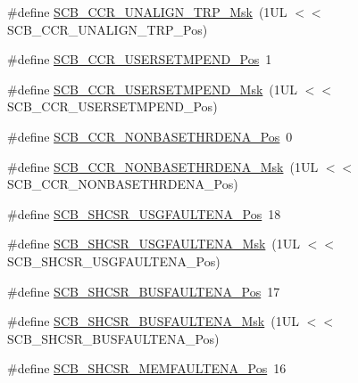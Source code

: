 \begin{DoxyCompactItemize}
\item 
\#define \hyperlink{group___c_m_s_i_s___s_c_b_ga68c96ad594af70c007923979085c99e0}{S\-C\-B\-\_\-\-C\-C\-R\-\_\-\-U\-N\-A\-L\-I\-G\-N\-\_\-\-T\-R\-P\-\_\-\-Msk}~(1\-U\-L $<$$<$ S\-C\-B\-\_\-\-C\-C\-R\-\_\-\-U\-N\-A\-L\-I\-G\-N\-\_\-\-T\-R\-P\-\_\-\-Pos)
\item 
\#define \hyperlink{group___c_m_s_i_s___s_c_b_ga789e41f45f59a8cd455fd59fa7652e5e}{S\-C\-B\-\_\-\-C\-C\-R\-\_\-\-U\-S\-E\-R\-S\-E\-T\-M\-P\-E\-N\-D\-\_\-\-Pos}~1
\item 
\#define \hyperlink{group___c_m_s_i_s___s_c_b_ga4cf59b6343ca962c80e1885710da90aa}{S\-C\-B\-\_\-\-C\-C\-R\-\_\-\-U\-S\-E\-R\-S\-E\-T\-M\-P\-E\-N\-D\-\_\-\-Msk}~(1\-U\-L $<$$<$ S\-C\-B\-\_\-\-C\-C\-R\-\_\-\-U\-S\-E\-R\-S\-E\-T\-M\-P\-E\-N\-D\-\_\-\-Pos)
\item 
\#define \hyperlink{group___c_m_s_i_s___s_c_b_gab4615f7deb07386350365b10240a3c83}{S\-C\-B\-\_\-\-C\-C\-R\-\_\-\-N\-O\-N\-B\-A\-S\-E\-T\-H\-R\-D\-E\-N\-A\-\_\-\-Pos}~0
\item 
\#define \hyperlink{group___c_m_s_i_s___s_c_b_gafe0f6be81b35d72d0736a0a1e3b4fbb3}{S\-C\-B\-\_\-\-C\-C\-R\-\_\-\-N\-O\-N\-B\-A\-S\-E\-T\-H\-R\-D\-E\-N\-A\-\_\-\-Msk}~(1\-U\-L $<$$<$ S\-C\-B\-\_\-\-C\-C\-R\-\_\-\-N\-O\-N\-B\-A\-S\-E\-T\-H\-R\-D\-E\-N\-A\-\_\-\-Pos)
\item 
\#define \hyperlink{group___c_m_s_i_s___s_c_b_gae71949507636fda388ec11d5c2d30b52}{S\-C\-B\-\_\-\-S\-H\-C\-S\-R\-\_\-\-U\-S\-G\-F\-A\-U\-L\-T\-E\-N\-A\-\_\-\-Pos}~18
\item 
\#define \hyperlink{group___c_m_s_i_s___s_c_b_ga056fb6be590857bbc029bed48b21dd79}{S\-C\-B\-\_\-\-S\-H\-C\-S\-R\-\_\-\-U\-S\-G\-F\-A\-U\-L\-T\-E\-N\-A\-\_\-\-Msk}~(1\-U\-L $<$$<$ S\-C\-B\-\_\-\-S\-H\-C\-S\-R\-\_\-\-U\-S\-G\-F\-A\-U\-L\-T\-E\-N\-A\-\_\-\-Pos)
\item 
\#define \hyperlink{group___c_m_s_i_s___s_c_b_ga3d32edbe4a5c0335f808cfc19ec7e844}{S\-C\-B\-\_\-\-S\-H\-C\-S\-R\-\_\-\-B\-U\-S\-F\-A\-U\-L\-T\-E\-N\-A\-\_\-\-Pos}~17
\item 
\#define \hyperlink{group___c_m_s_i_s___s_c_b_ga43e8cbe619c9980e0d1aacc85d9b9e47}{S\-C\-B\-\_\-\-S\-H\-C\-S\-R\-\_\-\-B\-U\-S\-F\-A\-U\-L\-T\-E\-N\-A\-\_\-\-Msk}~(1\-U\-L $<$$<$ S\-C\-B\-\_\-\-S\-H\-C\-S\-R\-\_\-\-B\-U\-S\-F\-A\-U\-L\-T\-E\-N\-A\-\_\-\-Pos)
\item 
\#define \hyperlink{group___c_m_s_i_s___s_c_b_ga685b4564a8760b4506f14ec4307b7251}{S\-C\-B\-\_\-\-S\-H\-C\-S\-R\-\_\-\-M\-E\-M\-F\-A\-U\-L\-T\-E\-N\-A\-\_\-\-Pos}~16
\item 
$$
\end{DoxyCompactItemize}
